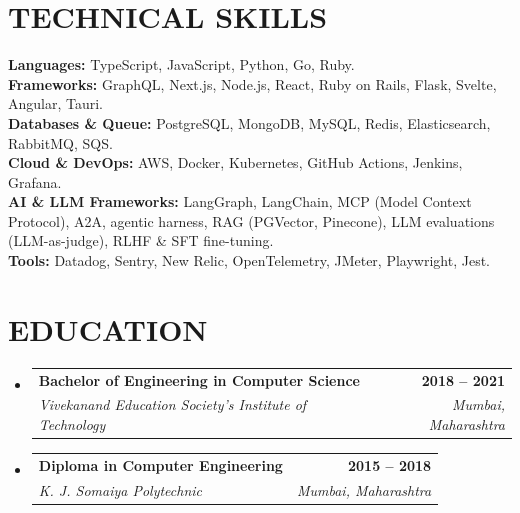\documentclass[letterpaper,11pt]{article}
\makeatletter
\newcommand{\resumeSubheading}[4]{
  \vspace{-2pt}\item
    \begin{tabular*}{1.0\textwidth}[t]{l@{\extracolsep{\fill}}r}
      \textbf{\large#1} & \textbf{\small #2} \\
      \textit{\small#3} & \textit{\small #4} \\
    \end{tabular*}\vspace{-7pt}
}
\newcommand{\resumeSubHeadingListStart}{\begin{itemize}[leftmargin=0.0in, label={}]}
\newcommand{\resumeSubHeadingListEnd}{\end{itemize}}
\makeatother
\begin{document}
\section{TECHNICAL SKILLS}
     \textbf{\normalsize{Languages:}}{ \normalsize{TypeScript, JavaScript, Python, Go, Ruby.}} \\
     \vspace{4pt}
     \textbf{\normalsize{Frameworks:}}{ \normalsize{GraphQL, Next.js, Node.js, React, Ruby on Rails, Flask, Svelte, Angular, Tauri.}} \\
    \vspace{4pt}
    \textbf{\normalsize{Databases \& Queue:}}{ \normalsize{PostgreSQL, MongoDB, MySQL, Redis, Elasticsearch, RabbitMQ, SQS.}} \\
    \vspace{4pt}
    \textbf{\normalsize{Cloud \& DevOps:}}{ \normalsize{AWS, Docker, Kubernetes, GitHub Actions, Jenkins, Grafana.}} \\
    \vspace{4pt}
    \textbf{\normalsize{AI \& LLM Frameworks:}}{ \normalsize{LangGraph, LangChain, MCP (Model Context Protocol), A2A, agentic harness, RAG (PGVector, Pinecone), LLM evaluations (LLM-as-judge), RLHF \& SFT fine-tuning.}} \\
    \vspace{4pt}
    \textbf{\normalsize{Tools:}}{ \normalsize{Datadog, Sentry, New Relic, OpenTelemetry, JMeter, Playwright, Jest.}} \\

\section{EDUCATION}
    \resumeSubHeadingListStart
    \resumeSubheading
      {Bachelor of Engineering in Computer Science}{2018 -- 2021}
      {Vivekanand Education Society's Institute of Technology}{Mumbai, Maharashtra}
    \resumeSubHeadingListEnd
    \vspace{-8pt}
  \resumeSubHeadingListStart
    \resumeSubheading
      {Diploma in Computer Engineering}{2015 -- 2018}
      {K. J. Somaiya Polytechnic}{Mumbai, Maharashtra}
  \resumeSubHeadingListEnd
\end{document}
